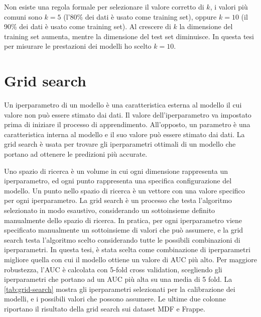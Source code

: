\documentclass[12pt,italian]{report}
\begin{document}
Non esiste una regola formale per selezionare il valore corretto di $k$, i valori più comuni sono $k=5$ (l'80\% dei dati è usato come training set), oppure $k=10$ (il 90\% dei dati è usato come training set). Al crescere di $k$ la dimensione del training set aumenta, mentre la dimensione del test set diminuisce. In questa tesi per misurare le prestazioni dei modelli ho scelto $k = 10$.

\section{Grid search} \label{sec:grid-search}
Un iperparametro di un modello è una caratteristica esterna al modello il cui valore non può essere stimato dai dati. Il valore dell'iperparametro va impostato prima di iniziare il processo di apprendimento. All'opposto, un parametro è una caratteristica interna al modello e il suo valore può essere stimato dai dati. La grid search è usata per trovare gli iperparametri ottimali di un modello che portano ad ottenere le predizioni più accurate. 

Uno spazio di ricerca è un volume in cui ogni dimensione rappresenta un iperparametro, ed ogni punto rappresenta una specifica configurazione del modello. Un punto nello spazio di ricerca è un vettore con una valore specifico per ogni iperparametro. La grid search è un processo che testa l'algoritmo selezionato in modo esaustivo, considerando un sottoinsieme definito manualmente dello spazio di ricerca. In pratica, per ogni iperparametro viene specificato manualmente un sottoinsieme di valori che può assumere, e la grid search testa l'algoritmo scelto
considerando tutte le possibili combinazioni di iperparametri.
In questa tesi, è stata scelta come combinazione di iperparametri migliore quella con cui il modello ottiene un valore di AUC più alto. Per maggiore robustezza, l'AUC è calcolata con 5-fold cross validation, scegliendo gli iperparametri che portano ad un AUC più alta su una media di 5 fold. La \autoref{tab:grid-search} mostra gli iperparametri selezionati per la calibrazione dei modelli, e i possibili valori che possono assumere. Le ultime due colonne riportano il risultato della grid search sui dataset MDF e Frappe.
\end{document}
